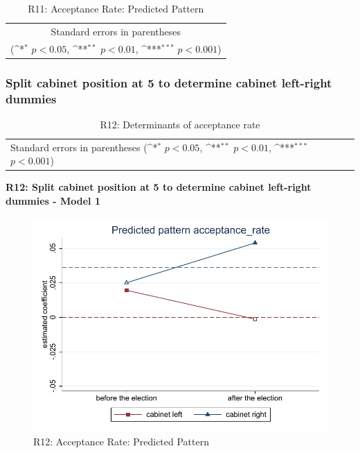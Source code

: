 \documentclass[10pt,a4paper]{scrartcl}
\begin{document}
\begin{table}[!ht]\centering
	\footnotesize
	\renewcommand{\arraystretch}{1.2}
	\def\sym#1{\ifmmode^{#1}\else\(^{#1}\)\fi}
	\caption{R11: Acceptance Rate: Predicted Pattern}
	\begin{tabular}{l*{2}{c}}
		\hline\hline
		
		\hline\hline
		\multicolumn{3}{c}{\footnotesize Standard errors in parentheses} \\
		\multicolumn{3}{c}{\footnotesize (\sym{*} \(p<0.05\), \sym{**} \(p<0.01\), \sym{***} \(p<0.001\))} \\
	\end{tabular}
\end{table}





\clearpage
\FloatBarrier
\subsubsection{Split cabinet position at 5 to determine cabinet left-right dummies}
\begin{table}[!ht]\centering
	\renewcommand{\arraystretch}{1.25}
	\small
	\def\sym#1{\ifmmode^{#1}\else\(^{#1}\)\fi}
	\caption{R12: Determinants of acceptance rate}
	\begin{tabular}{l*{3}{c}}
		\hline\hline
		
		\hline\hline
		\multicolumn{4}{l}{\footnotesize Standard errors in parentheses (\sym{*} \(p<0.05\), \sym{**} \(p<0.01\), \sym{***} \(p<0.001\))}\\
	\end{tabular}
\end{table}

\clearpage
\textbf{R12: Split cabinet position at 5 to determine cabinet left-right dummies - Model 1}
\begin{figure}[!ht]
	\centering
	\includegraphics[width=1\textwidth]{figures_edited/acceptance_rate_graph1_R12.pdf}
	\caption{R12: Acceptance Rate: Predicted Pattern}
\end{figure}
\end{document}
